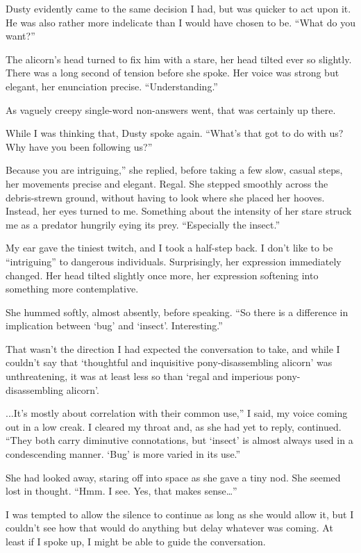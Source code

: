 Dusty evidently came to the same decision I had, but was quicker to act upon it. He was also rather more indelicate than I would have chosen to be. “What do you want?”

The alicorn’s head turned to fix him with a stare, her head tilted ever so slightly. There was a long second of tension before she spoke. Her voice was strong but elegant, her enunciation precise. “Understanding.”

As vaguely creepy single-word non-answers went, that was certainly up there.

While I was thinking that, Dusty spoke again. “What’s that got to do with us? Why have you been following us?”

\leavevmode{}Because you are intriguing,” she replied, before taking a few slow, casual steps, her movements precise and elegant. Regal. She stepped smoothly across the debris-strewn ground, without having to look where she placed her hooves. Instead, her eyes turned to me. Something about the intensity of her stare struck me as a predator hungrily eying its prey. “Especially the insect.”

My ear gave the tiniest twitch, and I took a half-step back. I don’t like to be “intriguing” to dangerous individuals. Surprisingly, her expression immediately changed. Her head tilted slightly once more, her expression softening into something more contemplative.

She hummed softly, almost absently, before speaking. “So there is a difference in implication between ‘bug’ and ‘insect’. Interesting.”

That wasn’t the direction I had expected the conversation to take, and while I couldn’t say that ‘thoughtful and inquisitive pony-disassembling alicorn’ was unthreatening, it was at least less so than ‘regal and imperious pony-disassembling alicorn’.

\leavevmode{}...It’s mostly about correlation with their common use,” I said, my voice coming out in a low creak. I cleared my throat and, as she had yet to reply, continued. “They both carry diminutive connotations, but ‘insect’ is almost always used in a condescending manner. ‘Bug’ is more varied in its use.”

She had looked away, staring off into space as she gave a tiny nod. She seemed lost in thought. “Hmm. I see. Yes, that makes sense…”

I was tempted to allow the silence to continue as long as she would allow it, but I couldn’t see how that would do anything but delay whatever was coming. At least if I spoke up, I might be able to guide the conversation.

